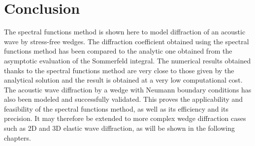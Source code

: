 \section*{Conclusion}
The spectral functions method is shown here to model diffraction of an acoustic wave by stress-free wedges. The diffraction coefficient obtained using the spectral functions method has been compared to the analytic one obtained from the asymptotic evaluation of the Sommerfeld integral. The numerical results obtained thanks to the spectral functions method are very close to those given by the analytical solution and the result is obtained at a very low computational cost. The acoustic wave diffraction by a wedge with Neumann boundary conditions has also been modeled and successfully validated. This proves the applicability and feasibility of the spectral functions method, as well as its efficiency and its precision. It may therefore be extended to more complex wedge diffraction cases such as 2D and 3D elastic wave diffraction, as will be shown in the following chapters. 

